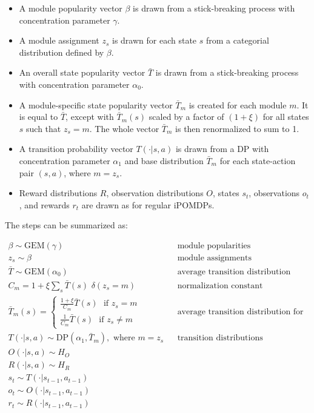 \documentclass[11pt]{article}
\begin{document}
\begin{itemize}
\item A module popularity vector $\beta$ is drawn from a stick-breaking process with concentration parameter $\gamma$.
\item A module assignment $z_s$ is drawn for each state $s$ from a categorial distribution defined by $\beta$.
\item An overall state popularity vector $\bar{T}$ is drawn from a stick-breaking process with concentration parameter $\alpha_0$.
\item A module-specific state popularity vector $\bar{T}_m$ is created for each module $m$. It is equal to $\bar{T}$, except with $\bar{T}_m(s)$ scaled by a factor of $(1 + \xi)$ for all states $s$ such that $z_s = m$. The whole vector $\bar{T}_m$ is then renormalized to sum to 1.
\item A transition probability vector $T(\cdot | s,a)$ is drawn from a DP with concentration parameter $\alpha_1$ and base distribution $\bar{T}_m$ for each state-action pair $(s,a)$, where $m = z_s$.
\item Reward distributions $R$, observation distributions $O$, states $s_t$, observations $o_t$, and rewards $r_t$ are drawn as for regular iPOMDPs.
\end{itemize}

The steps can be summarized as:

\begin{align*}
\beta \sim \text{GEM}(\gamma)   		&& \text{module popularities} \\
z_s \sim \beta   		&& \text{module assignments} \\
\bar{T} \sim \text{GEM}(\alpha_0)     		&& \text{average transition distribution} \\
C_m =  1 + \xi {\sum_s \bar{T}(s) \,\, \delta(z_s = m) }   		&& \text{normalization constant} \\
\bar{T}_m(s) = \begin{cases} \frac{1 + \xi}{C_m} \bar{T}(s)  \,\, \text{ if }  z_s = m \\  \frac{1}{C_m} \bar{T}(s) \,\, \text{ if } z_s \ne m \end{cases}     		&& \text{average transition distribution for each module} \\ 
T(\cdot | s,a) \sim \text{DP}(\alpha_1, \bar{T}_m), \text{ where } m = z_s 		 && \text{transition distributions}\\
O(\cdot | s,a) \sim H_O \\
R(\cdot | s,a) \sim H_R \\
s_t \sim T(\cdot | s_{t-1},a_{t-1}) \\
o_t \sim O(\cdot | s_{t-1}, a_{t-1}) \\
r_t \sim R(\cdot | s_{t-1}, a_{t-1}) 
\end{align*}
\end{document}
